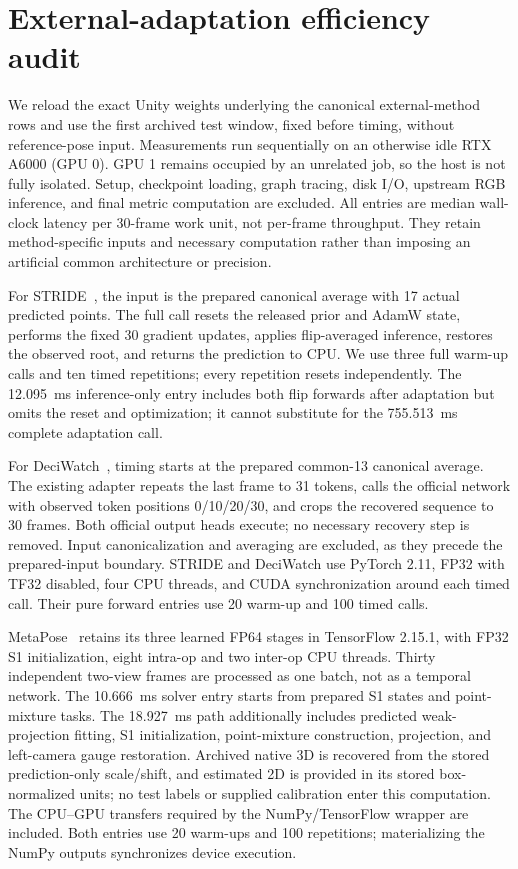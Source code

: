 \documentclass[11pt,letterpaper]{article}
\begin{document}
\FloatBarrier
\section{External-adaptation efficiency audit}
\label{sec:external_fusion_efficiency}

We reload the exact Unity weights underlying the canonical external-method rows and use the first archived test window, fixed before timing, without reference-pose input. Measurements run sequentially on an otherwise idle RTX A6000 (GPU 0). GPU 1 remains occupied by an unrelated job, so the host is not fully isolated. Setup, checkpoint loading, graph tracing, disk I/O, upstream RGB inference, and final metric computation are excluded. All entries are median wall-clock latency per 30-frame work unit, not per-frame throughput. They retain method-specific inputs and necessary computation rather than imposing an artificial common architecture or precision.

For STRIDE~\cite{lal2025stride}, the input is the prepared canonical average with 17 actual predicted points. The full call resets the released prior and AdamW state, performs the fixed 30 gradient updates, applies flip-averaged inference, restores the observed root, and returns the prediction to CPU. We use three full warm-up calls and ten timed repetitions; every repetition resets independently. The 12.095~ms inference-only entry includes both flip forwards after adaptation but omits the reset and optimization; it cannot substitute for the 755.513~ms complete adaptation call.

For DeciWatch~\cite{zeng2022deciwatch}, timing starts at the prepared common-13 canonical average. The existing adapter repeats the last frame to 31 tokens, calls the official network with observed token positions 0/10/20/30, and crops the recovered sequence to 30 frames. Both official output heads execute; no necessary recovery step is removed. Input canonicalization and averaging are excluded, as they precede the prepared-input boundary. STRIDE and DeciWatch use PyTorch 2.11, FP32 with TF32 disabled, four CPU threads, and CUDA synchronization around each timed call. Their pure forward entries use 20 warm-up and 100 timed calls.

MetaPose~\cite{usman2022metapose} retains its three learned FP64 stages in TensorFlow 2.15.1, with FP32 S1 initialization, eight intra-op and two inter-op CPU threads. Thirty independent two-view frames are processed as one batch, not as a temporal network. The 10.666~ms solver entry starts from prepared S1 states and point-mixture tasks. The 18.927~ms path additionally includes predicted weak-projection fitting, S1 initialization, point-mixture construction, projection, and left-camera gauge restoration. Archived native 3D is recovered from the stored prediction-only scale/shift, and estimated 2D is provided in its stored box-normalized units; no test labels or supplied calibration enter this computation. The CPU--GPU transfers required by the NumPy/TensorFlow wrapper are included. Both entries use 20 warm-ups and 100 repetitions; materializing the NumPy outputs synchronizes device execution.
\end{document}
